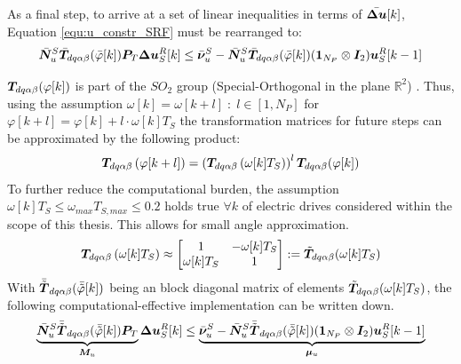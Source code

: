 As a final step, to arrive at a set of linear inequalities in terms of $\Bar{\bm{\Delta u}}[k]$, Equation \eqref{equ:u_constr_SRF} must be rearranged to:
\[
\Bar{\bm{N}}_u^S \Bar{\bm{T}}_{ d q \alpha \beta}(\Bar{\varphi} [k]) \bm{P}_T\bm{\Delta u}_S^R[k]  \le \Bar{\bm{\nu}}^S_u - \Bar{\bm{N}}_u^S \Bar{\bm{T}}_{ d q \alpha \beta}(\Bar{\varphi} [k]) (\bm{1}_{N_P} \otimes \bm{I}_2)\bm{u}_S^R[k-1] 
\]



$\bm{T}_{ d q \alpha \beta}(\varphi [k])$ is part of the $SO_2$ group (Special-Orthogonal in the plane $\mathbb{R}^2$) \cite{KaR2}. Thus, using the assumption $\omega[k] = \omega[k+l]\;: \; l\in[1, N_P]$ for $\varphi[k+l] = \varphi[k] + l\cdot\omega[k]T_S$ the transformation matrices for future steps can be approximated by the following product:
\[
\bm{T}_{ d q \alpha \beta}\left(\varphi[k+l]\right) =\left(\bm{T}_{ d q \alpha \beta}\left(\omega[k] T_S\right) \right)^l \bm{T}_{ d q \alpha \beta}(\varphi [k])
\]
To further reduce the computational burden, the assumption $\omega[k] T_S \le \omega_{max}T_{S,max} \le 0.2$ holds true $\forall k$ of electric drives considered within the scope of this thesis. This allows for small angle approximation.
\[
\bm{T}_{ d q \alpha \beta}\left(\omega[k] T_S\right) \approx \begin{bmatrix}
	1 & -\omega[k] T_S\\ \omega[k] T_S & 1 
\end{bmatrix} := \Tilde{\bm{T}}_{dq\alpha \beta} (\omega[k] T_S)
\]
With ${\Bar{\Tilde{\bm{T}}}}_{dq\alpha \beta}(\Bar{\Tilde{\varphi}}[k])$ being an block diagonal matrix of elements $\Tilde{\bm{T}}_{dq\alpha \beta} (\omega[k] T_S)$, the following computational-effective implementation can be written down.
\begin{equation}
	\underbrace{ 
		\Bar{\bm{N}}_u^S {\Bar{\Tilde{\bm{T}}}}_{dq\alpha \beta}(\Bar{\Tilde{\varphi}}[k]) \bm{P}_T
	}_{\bm{M}_u} 
	\bm{\Delta u}_S^R[k]  \le 
	\underbrace{
		\Bar{\bm{\nu}}^S_u- \Bar{\bm{N}}_u^S {\Bar{\Tilde{\bm{T}}}}_{dq\alpha \beta}(\Bar{\Tilde{\varphi}}[k]) (\bm{1}_{N_P} \otimes \bm{I}_2)\bm{u}_S^R[k-1] 
	}_{\bm{\mu}_u}
	\label{equ:lmi_u}
\end{equation}


